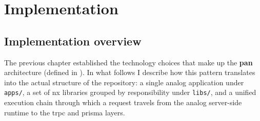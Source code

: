 \section{Implementation}\label{cap:implementare}

\subsection{Implementation overview}

The previous chapter established the technology choices that make up the \textbf{\gls{pan}} architecture (defined in ). In what follows I describe how this pattern translates into the actual structure of the repository: a single \gls{analog} application under \texttt{apps/}, a set of \gls{nx} libraries grouped by responsibility under \texttt{libs/}, and a unified execution chain through which a request travels from the \gls{analog} server-side runtime to the \gls{trpc} and \gls{prisma} layers.

\needspace{15cm}
